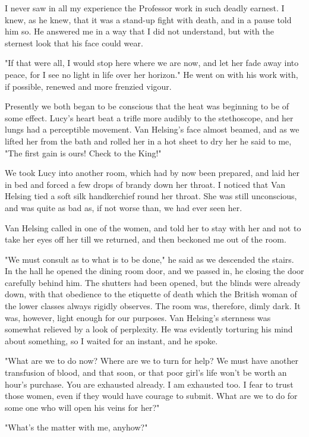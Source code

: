 I never saw in all my experience the Professor work in such deadly earnest. I knew, as he knew, that it was a stand-up fight with death, and in a pause told him so. He answered me in a way that I did not understand, but with the sternest look that his face could wear. 

"If that were all, I would stop here where we are now, and let her fade away into peace, for I see no light in life over her horizon." He went on with his work with, if possible, renewed and more frenzied vigour. 

Presently we both began to be conscious that the heat was beginning to be of some effect. Lucy's heart beat a trifle more audibly to the stethoscope, and her lungs had a perceptible movement. Van Helsing's face almost beamed, and as we lifted her from the bath and rolled her in a hot sheet to dry her he said to me, "The first gain is ours! Check to the King!" 

We took Lucy into another room, which had by now been prepared, and laid her in bed and forced a few drops of brandy down her throat. I noticed that Van Helsing tied a soft silk handkerchief round her throat. She was still unconscious, and was quite as bad as, if not worse than, we had ever seen her. 

Van Helsing called in one of the women, and told her to stay with her and not to take her eyes off her till we returned, and then beckoned me out of the room. 

"We must consult as to what is to be done," he said as we descended the stairs. In the hall he opened the dining room door, and we passed in, he closing the door carefully behind him. The shutters had been opened, but the blinds were already down, with that obedience to the etiquette of death which the British woman of the lower classes always rigidly observes. The room was, therefore, dimly dark. It was, however, light enough for our purposes. Van Helsing's sternness was somewhat relieved by a look of perplexity. He was evidently torturing his mind about something, so I waited for an instant, and he spoke. 

"What are we to do now? Where are we to turn for help? We must have another transfusion of blood, and that soon, or that poor girl's life won't be worth an hour's purchase. You are exhausted already. I am exhausted too. I fear to trust those women, even if they would have courage to submit. What are we to do for some one who will open his veins for her?" 

"What's the matter with me, anyhow?" 

